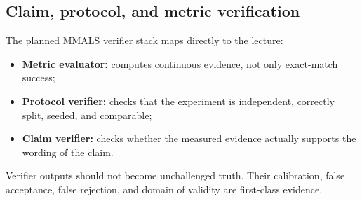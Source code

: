 \subsection{Claim, protocol, and metric verification}

The planned MMALS verifier stack maps directly to the lecture:

\begin{itemize}[leftmargin=*]
  \item \textbf{Metric evaluator:} computes continuous evidence, not only exact-match success;
  \item \textbf{Protocol verifier:} checks that the experiment is independent, correctly split, seeded, and comparable;
  \item \textbf{Claim verifier:} checks whether the measured evidence actually supports the wording of the claim.
\end{itemize}

Verifier outputs should not become unchallenged truth. Their calibration, false acceptance, false rejection, and domain of validity are first-class evidence.
